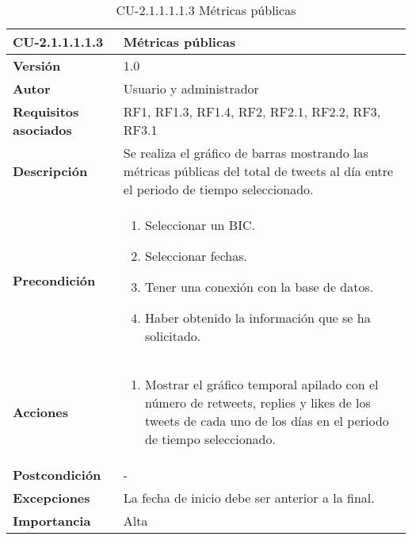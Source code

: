 \begin{table}[h!]
	\centering
	\begin{tabularx}{\linewidth}{ p{} p{} }
		\toprule
		\textbf{CU-2.1.1.1.1.3}    & \textbf{Métricas públicas}\\
		\toprule
		\textbf{Versión}              & 1.0    \\
		\textbf{Autor}                & Usuario y administrador \\
		\textbf{Requisitos asociados} & RF1, RF1.3, RF1.4, RF2, RF2.1, RF2.2, RF3, RF3.1\\
		\textbf{Descripción}          & Se realiza el gráfico de barras mostrando las métricas públicas del total de tweets al día entre el periodo de tiempo seleccionado.  \\
        \textbf{Precondición}         & 
        \begin{enumerate}
			\def\labelenumi{\arabic{enumi}.}
			\tightlist
                \item Seleccionar un BIC.
                \item Seleccionar fechas. 
			\item Tener una conexión con la base de datos.
                \item Haber obtenido la información que se ha solicitado.
            
		\end{enumerate}\\
		
		\textbf{Acciones}             &
		\begin{enumerate}
			\def\labelenumi{\arabic{enumi}.}
			\tightlist
			\item Mostrar el gráfico temporal apilado con el número de retweets, replies y likes de los tweets de cada uno de los días en el periodo de tiempo seleccionado.
            
		\end{enumerate}\\
		\textbf{Postcondición}        &  - \\
		\textbf{Excepciones}          &  La fecha de inicio debe ser anterior a la final.\\
		\textbf{Importancia}          & Alta \\
		\bottomrule
	\end{tabularx}
	\caption{CU-2.1.1.1.1.3 Métricas públicas}
\end{table}
